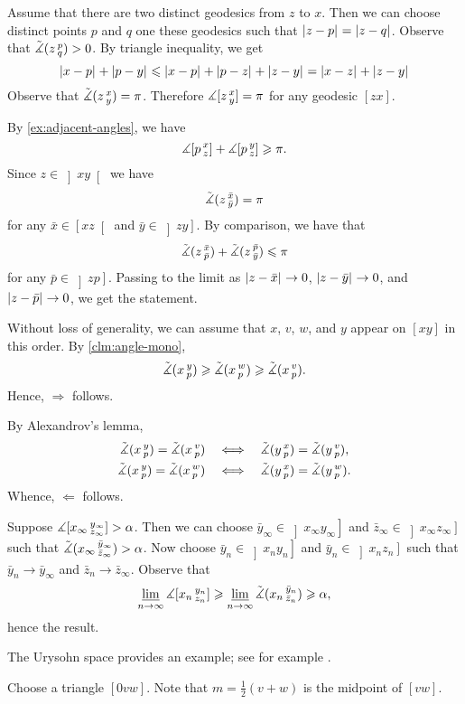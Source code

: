 Assume that there are two distinct geodesics from $z$ to $x$.
Then we can choose distinct points $p$ and $q$ one these geodesics such that $\dist{z}{p}{}=\dist{z}{q}{}$.
Observe that $\tilde\measuredangle(z\,{}^{p}_{q})>0$.
By triangle inequality, we get 
\[\dist{x}{p}{}+\dist{p}{y}{}\le \dist{x}{p}{}+\dist{p}{z}{}+\dist{z}{y}{}=\dist{x}{z}{}+\dist{z}{y}{}\]
Observe that $\tilde\measuredangle(z\,{}^{x}_{y})=\pi$.
Therefore $\measuredangle[z\,{}^{x}_{y}]=\pi$ for any geodesic $[zx]$.

By \ref{ex:adjacent-angles}, we have
\[\measuredangle[p\,{}^{x}_{z}]+\measuredangle[p\,{}^{y}_{z}]\geqslant \pi.\]
Since $z\in \left]xy\right[$ we have 
\[\tilde\measuredangle(z\,{}^{\bar x}_{\bar y})=\pi\]
for any $\bar x\in \left[xz\right[$ and $\bar y\in \left]zy\right]$.
By comparison, we have that 
\[\tilde\measuredangle(z\,{}^{\bar x}_{\bar p})+\tilde\measuredangle(z\,{}^{\bar p}_{\bar y})\leqslant\pi\]
for any $\bar p\in \left]zp\right]$.
Passing to the limit as
$\dist{z}{\bar x}{}\to 0$,
$\dist{z}{\bar y}{}\to 0$, and
$\dist{z}{\bar p}{}\to 0$,
we get the statement.

Without loss of generality, we can assume that $x$, $v$, $w$, and $y$ appear on 
$[xy]$ in this order.
By \ref{clm:angle-mono},
\[
\tilde\measuredangle(x\,{}^{y}_{p})\geqslant \tilde\measuredangle(x\,{}^{w}_{p}) \geqslant\tilde\measuredangle(x\,{}^{v}_{p}).
\]
Hence, $\Rightarrow$ follows.

By Alexandrov's lemma,
\begin{align*}
\tilde\measuredangle(x\,{}^{y}_{p})=\tilde\measuredangle(x\,{}^{v}_{p})
\quad&\Longleftrightarrow\quad
\tilde\measuredangle(y\,{}^{x}_{p})=\tilde\measuredangle(y\,{}^{v}_{p}),
\\
\tilde\measuredangle(x\,{}^{y}_{p})=\tilde\measuredangle(x\,{}^{w}_{p})
\quad&\Longleftrightarrow\quad
\tilde\measuredangle(y\,{}^{x}_{p})=\tilde\measuredangle(y\,{}^{w}_{p}).
\end{align*}
Whence, $\Leftarrow$ follows.

 Suppose $\measuredangle [x_\infty\,{}^{y_\infty}_{z_\infty}]>\alpha$.
Then we can choose $\bar y_\infty\in\left]x_\infty y_\infty\right]$
and $\bar z_\infty\in\left]x_\infty z_\infty\right]$ such that 
$\tilde\measuredangle(x_\infty\,{}^{\bar y_\infty}_{\bar z_\infty})>\alpha$.
Now choose $\bar y_n\in\left]x_n y_n\right]$ and $\bar y_n\in\left]x_n z_n\right]$ such that $\bar y_n\to \bar y_\infty$ and $\bar z_n\to \bar z_\infty$.
Observe that 
\[\varliminf_{n\to\infty}\measuredangle [x_n\,{}^{y_n}_{z_n}]\geqslant\varliminf_{n\to\infty}\tilde\measuredangle(x_n\,{}^{\bar y_n}_{\bar z_n}) \geqslant \alpha,\]
hence the result.

The Urysohn space provides an example;
see for example \cite[Lecture 2]{petrunin2023pure}.

Choose a triangle $[0vw]$.
Note that $m=\tfrac12(v+w)$ is the midpoint of $[vw]$.

